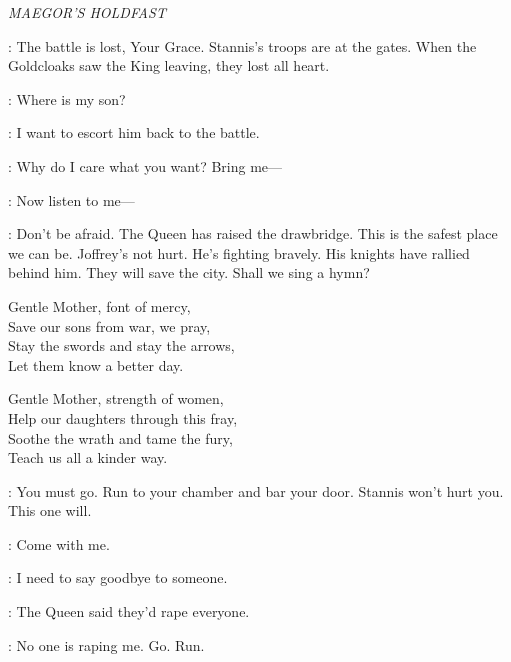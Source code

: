 

\scene

\textit{MAEGOR'S HOLDFAST}


\LANCEL: The battle is lost, Your Grace. Stannis's troops are at the gates. When the Goldcloaks saw the King leaving, they lost all heart. 

\CERSEI: Where is my son? 

\LANCEL: I want to escort him back to the battle. 

\CERSEI: Why do I care what you want? Bring me---

\LANCEL: Now listen to me--- 


\SANSA:  Don't be afraid. The Queen has raised the drawbridge. This is the safest place we can be. Joffrey's not hurt. He's fighting bravely. His knights have rallied behind him. They will save the city. Shall we sing a hymn? 


Gentle Mother, font of mercy,\\
Save our sons from war, we pray,\\
Stay the swords and stay the arrows,\\
Let them know a better day.

Gentle Mother, strength of women,\\
Help our daughters through this fray,\\
Soothe the wrath and tame the fury,\\
Teach us all a kinder way.

\SHAE:  You must go. Run to your chamber and bar your door. Stannis won't hurt you.  This one will. 

\SANSA: Come with me. 

\SHAE: I need to say goodbye to someone. 

\SANSA: The Queen said they'd rape everyone. 

\SHAE:  No one is raping me. Go. Run. 


